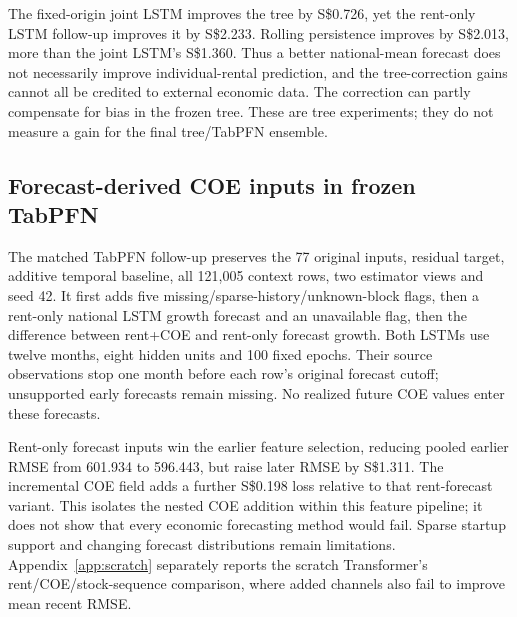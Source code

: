 \documentclass[conference]{IEEEtran}
\newcommand{\sgd}{S\$}
\begin{document}
\begin{table}[!ht]
\caption{Individual-rental RMSE (SGD) after an earlier-fitted national-index correction. Both scenarios start from the same uncorrected tree RMSE of 471.631. Negative differences improve that control. Follow-up rows were added after inspection of the aggregate study; their models, windows and scales still use earlier data.}
\label{tab:auxtransfer}
\centering\small

\end{table}

The fixed-origin joint LSTM improves the tree by \sgd0.726, yet the rent-only LSTM follow-up improves it by \sgd2.233. Rolling persistence improves by \sgd2.013, more than the joint LSTM's \sgd1.360. Thus a better national-mean forecast does not necessarily improve individual-rental prediction, and the tree-correction gains cannot all be credited to external economic data. The correction can partly compensate for bias in the frozen tree. These are tree experiments; they do not measure a gain for the final tree/TabPFN ensemble.

\subsection{Forecast-derived COE inputs in frozen TabPFN}
The matched TabPFN follow-up preserves the 77 original inputs, residual target, additive temporal baseline, all 121,005 context rows, two estimator views and seed 42. It first adds five missing/sparse-history/unknown-block flags, then a rent-only national LSTM growth forecast and an unavailable flag, then the difference between rent+COE and rent-only forecast growth. Both LSTMs use twelve months, eight hidden units and 100 fixed epochs. Their source observations stop one month before each row's original forecast cutoff; unsupported early forecasts remain missing. No realized future COE values enter these forecasts.

\begin{table}[!ht]
\caption{Nested forecast-input additions to frozen TabPFN: individual-rental errors in SGD on the identical recent-window rows. Differences use the original 77-input control. The unavailable flag and rent forecast enter together.}
\label{tab:auxpfn}
\centering\small

\end{table}

Rent-only forecast inputs win the earlier feature selection, reducing pooled earlier RMSE from 601.934 to 596.443, but raise later RMSE by \sgd1.311. The incremental COE field adds a further \sgd0.198 loss relative to that rent-forecast variant. This isolates the nested COE addition within this feature pipeline; it does not show that every economic forecasting method would fail. Sparse startup support and changing forecast distributions remain limitations. Appendix~\ref{app:scratch} separately reports the scratch Transformer's rent/COE/stock-sequence comparison, where added channels also fail to improve mean recent RMSE.
\end{document}
